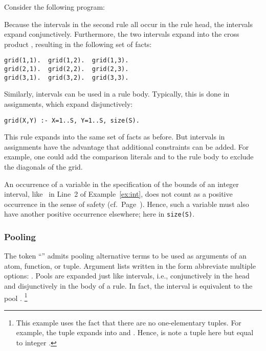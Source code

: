\begin{example}\label{ex:int}
Consider the following program:

Because the intervals in the second rule all occur in the rule head,
the intervals expand conjunctively.
Furthermore, the two intervals expand into the cross product ,
resulting in the following set of facts:
\begin{lstlisting}[numbers=none]
grid(1,1).  grid(1,2).  grid(1,3).
grid(2,1).  grid(2,2).  grid(2,3).
grid(3,1).  grid(3,2).  grid(3,3).
\end{lstlisting}
Similarly, intervals can be used in a rule body.
Typically, this is done in assignments, which expand disjunctively:
\begin{lstlisting}[firstnumber=2]
grid(X,Y) :- X=1..S, Y=1..S, size(S).
\end{lstlisting}
This rule expands into the same set of facts as before.
But intervals in assignments have the advantage that additional constraints can be added.
For example, one could add the comparison literals  and 
to the rule body to exclude the diagonals of the grid.
\eexample
\end{example}

\begin{note}
An occurrence of a variable in the specification of the bounds
of an integer interval, like~ in Line~2 of Example~\ref{ex:int}, 
does not count as a positive occurrence
in the sense of safety (cf.\ Page~\pageref{pg:safe}).
Hence, such a variable must also have another positive occurrence elsewhere;
here in \lstinline{size(S)}.
%
\end{note}

\subsubsection{Pooling}\label{subsec:gringo:pool}

The token ``\code{;}'' admits pooling alternative terms
to be used as arguments of an atom, function, or tuple. %
Argument lists written in the form  abbreviate multiple options:
.
Pools are expanded just like intervals, i.e.,
conjunctively in the head and disjunctively in the body of a rule.
In fact, the interval  is equivalent to the pool .%
\footnote{%
This example uses the fact that there are no one-elementary tuples.
For example, the tuple  expands into  and .
Hence,  is note a tuple here but equal to integer .}

